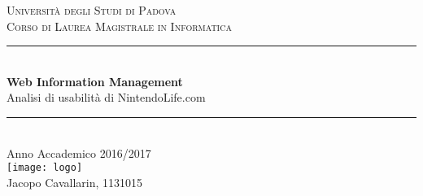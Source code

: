 \documentclass[12pt, a4paper,titlepage]{article}
\newcommand\FigList{}
\newcommand\AddFigToList[1]{\edef\FigList{\FigList#1,}}
\renewcommand{\includegraphics}[2][]{%
    \AddFigToList{#2}%
    \OldIncludegraphics[#1]{#2}%
}
\begin{document}
\begin{titlepage}

\newcommand{\HRule}{\rule{\linewidth}{0.5mm}} %

\center %


\vspace*{\fill}
\textsc{\Large Università degli Studi di Padova}\\[0.5cm] %
\textsc{\large Corso di Laurea Magistrale in Informatica}\\[0.5cm] %


\HRule \\[0.4cm]
{ \huge \textbf{Web Information Management}\\[0.4cm] Analisi di usabilità di NintendoLife.com}\\[0.4cm] %
\HRule \\[0.5cm]
\large{Anno Accademico 2016/2017}\\[1cm]
\texttt{[image: logo]}\\[1cm] %
Jacopo Cavallarin, 1131015
\vspace*{\fill}





\vfill %

\end{titlepage}
\newpage
\tableofcontents
\thispagestyle{empty}
\clearpage
{}
\pagestyle{fancy}
\end{document}

